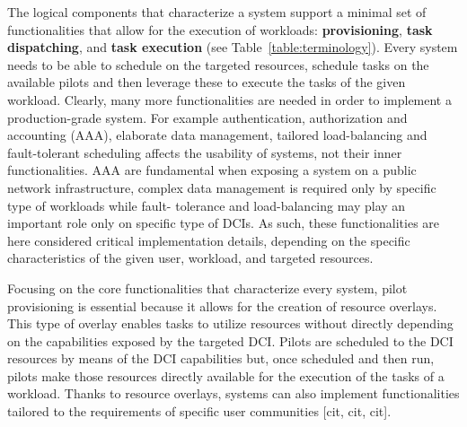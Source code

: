\documentclass{sig-alternate}
\begin{document}

The logical components that characterize a \pilotjob system support a
minimal set of functionalities that allow for the execution of
workloads: \textbf{\pilot provisioning}, \textbf{task dispatching}, and
\textbf{task execution} (see Table~\ref{table:terminology}). Every
\pilotjob system needs to be able to schedule \pilotjobs on the targeted
resources, schedule tasks on the available pilots and then leverage
these \pilots to execute the tasks of the given workload. Clearly, many
more functionalities are needed in order to implement a production-grade
\pilotjob system. For example authentication, authorization and
accounting (AAA), elaborate data management, tailored load-balancing and
fault-tolerant scheduling affects the usability of \pilotjob systems,
not their inner functionalities. AAA are fundamental when exposing a
\pilotjob system on a public network infrastructure, complex data
management is required only by specific type of workloads while fault-
tolerance and load-balancing may play an important role only on specific
type of DCIs. As such, these functionalities are here considered critical
implementation details, depending on the specific characteristics of the
given user, workload, and targeted resources.


Focusing on the core functionalities that characterize every \pilotjob
system, pilot provisioning is essential because it allows for the
creation of resource overlays. This type of overlay enables tasks to
utilize resources without directly depending on the capabilities exposed
by the targeted DCI. Pilots are scheduled to the DCI resources by means
of the DCI capabilities but, once scheduled and then run, pilots make
those resources directly available for the execution of the tasks of a
workload. Thanks to resource overlays, \pilotjob systems can also implement
functionalities tailored to the requirements of specific user
communities [cit, cit, cit].
\end{document}
